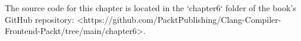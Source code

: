 \begin{markdown}

The source code for this chapter is located in the `chapter6` folder of the book's GitHub repository: <https://github.com/PacktPublishing/Clang-Compiler-Frontend-Packt/tree/main/chapter6>.
\end{markdown}
